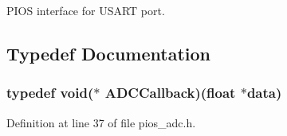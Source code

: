 P\-I\-O\-S interface for U\-S\-A\-R\-T port.

\subsection{Typedef Documentation}
\hypertarget{group___p_i_o_s___a_d_c_ga20bf90833813c2c4945fab90c8e4f386}{
\subsubsection[{A\-D\-C\-Callback}]{\setlength{\rightskip}{0pt plus 5cm}typedef {\bf void}($\ast$ A\-D\-C\-Callback)(float $\ast${\bf data})}}\label{group___p_i_o_s___a_d_c_ga20bf90833813c2c4945fab90c8e4f386}


Definition at line 37 of file pios\-\_\-adc.\-h.



